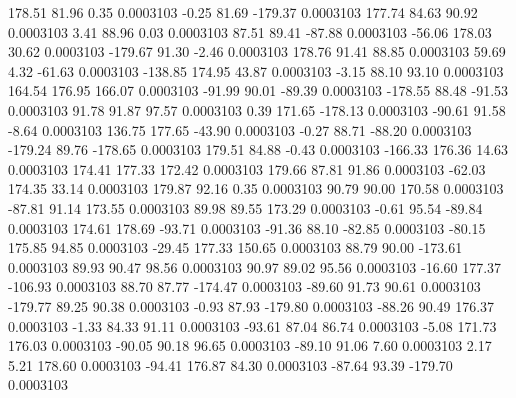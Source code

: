       178.51       81.96        0.35     0.0003103
       -0.25       81.69     -179.37     0.0003103
      177.74       84.63       90.92     0.0003103
        3.41       88.96        0.03     0.0003103
       87.51       89.41      -87.88     0.0003103
      -56.06      178.03       30.62     0.0003103
     -179.67       91.30       -2.46     0.0003103
      178.76       91.41       88.85     0.0003103
       59.69        4.32      -61.63     0.0003103
     -138.85      174.95       43.87     0.0003103
       -3.15       88.10       93.10     0.0003103
      164.54      176.95      166.07     0.0003103
      -91.99       90.01      -89.39     0.0003103
     -178.55       88.48      -91.53     0.0003103
       91.78       91.87       97.57     0.0003103
        0.39      171.65     -178.13     0.0003103
      -90.61       91.58       -8.64     0.0003103
      136.75      177.65      -43.90     0.0003103
       -0.27       88.71      -88.20     0.0003103
     -179.24       89.76     -178.65     0.0003103
      179.51       84.88       -0.43     0.0003103
     -166.33      176.36       14.63     0.0003103
      174.41      177.33      172.42     0.0003103
      179.66       87.81       91.86     0.0003103
      -62.03      174.35       33.14     0.0003103
      179.87       92.16        0.35     0.0003103
       90.79       90.00      170.58     0.0003103
      -87.81       91.14      173.55     0.0003103
       89.98       89.55      173.29     0.0003103
       -0.61       95.54      -89.84     0.0003103
      174.61      178.69      -93.71     0.0003103
      -91.36       88.10      -82.85     0.0003103
      -80.15      175.85       94.85     0.0003103
      -29.45      177.33      150.65     0.0003103
       88.79       90.00     -173.61     0.0003103
       89.93       90.47       98.56     0.0003103
       90.97       89.02       95.56     0.0003103
      -16.60      177.37     -106.93     0.0003103
       88.70       87.77     -174.47     0.0003103
      -89.60       91.73       90.61     0.0003103
     -179.77       89.25       90.38     0.0003103
       -0.93       87.93     -179.80     0.0003103
      -88.26       90.49      176.37     0.0003103
       -1.33       84.33       91.11     0.0003103
      -93.61       87.04       86.74     0.0003103
       -5.08      171.73      176.03     0.0003103
      -90.05       90.18       96.65     0.0003103
      -89.10       91.06        7.60     0.0003103
        2.17        5.21      178.60     0.0003103
      -94.41      176.87       84.30     0.0003103
      -87.64       93.39     -179.70     0.0003103
